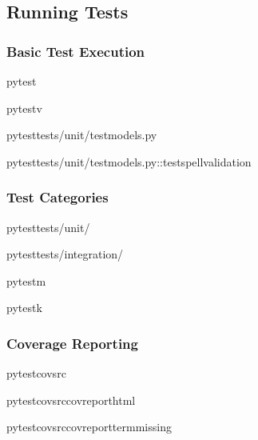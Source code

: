 \documentclass[letterpaper,10pt,english]{sphinxmanual}
\begin{document}
\subsection{Running Tests}
\label{\detokenize{developer/testing:running-tests}}

\subsubsection{Basic Test Execution}
\label{\detokenize{developer/testing:basic-test-execution}}
\begin{sphinxVerbatim}[commandchars=\\\{\}]
pytest

pytest\PYGZhy{}v

pytesttests/unit/test\PYGZus{}models.py

pytesttests/unit/test\PYGZus{}models.py::test\PYGZus{}spell\PYGZus{}validation
\end{sphinxVerbatim}


\subsubsection{Test Categories}
\label{\detokenize{developer/testing:test-categories}}
\begin{sphinxVerbatim}[commandchars=\\\{\}]
pytesttests/unit/

pytesttests/integration/

pytest\PYGZhy{}m

pytest\PYGZhy{}k
\end{sphinxVerbatim}


\subsubsection{Coverage Reporting}
\label{\detokenize{developer/testing:coverage-reporting}}
\begin{sphinxVerbatim}[commandchars=\\\{\}]
pytest\PYGZhy{}\PYGZhy{}covsrc

pytest\PYGZhy{}\PYGZhy{}covsrc\PYGZhy{}\PYGZhy{}cov\PYGZhy{}reporthtml

pytest\PYGZhy{}\PYGZhy{}covsrc\PYGZhy{}\PYGZhy{}cov\PYGZhy{}reportterm\PYGZhy{}missing
\end{sphinxVerbatim}
\end{document}
